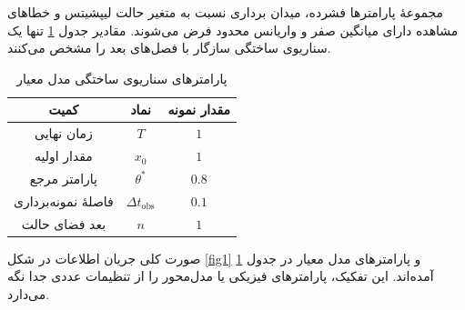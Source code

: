 مجموعهٔ پارامترها فشرده، میدان برداری نسبت به متغیر حالت لیپشیتس و خطاهای مشاهده دارای میانگین صفر و واریانس محدود فرض می‌شوند. مقادیر جدول \ref{tab:model-parameters} تنها یک سناریوی ساختگی سازگار با فصل‌های بعد را مشخص می‌کنند.

\begin{table}[htbp]
  \centering
  \begin{tabular}{ccc}
    \toprule
    کمیت & نماد & مقدار نمونه \\
    \midrule
    زمان نهایی & $T$ & $1$ \\
    مقدار اولیه & $x_0$ & $1$ \\
    پارامتر مرجع & $\theta^{\ast}$ & $0.8$ \\
    فاصلهٔ نمونه‌برداری & $\Delta t_{\mathrm{obs}}$ & $0.1$ \\
    بعد فضای حالت & $n$ & $1$ \\
    \bottomrule
  \end{tabular}
  \caption{پارامترهای سناریوی ساختگی مدل معیار}
  \label{tab:model-parameters}
\end{table}

صورت کلی جریان اطلاعات در شکل \ref{fig1} و پارامترهای مدل معیار در جدول \ref{tab:model-parameters} آمده‌اند. این تفکیک، پارامترهای فیزیکی یا مدل‌محور را از تنظیمات عددی جدا نگه می‌دارد.
